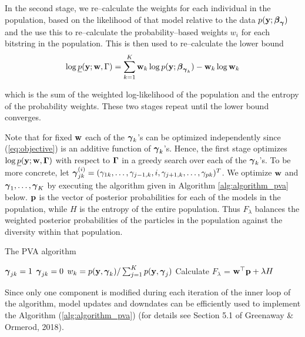 In the second stage, we re--calculate the weights for each individual in the population, based on the
likelihood of that model relative to the data $p({\bf y}; {\boldsymbol \beta}_{\boldsymbol \gamma})$ and the use this to re--calculate the
probability--based weights $w_i$ for each bitstring in the population. This is then used to re--calculate the
lower bound
\[
	\log \underline{p}({\bf y}; {\bf w}, \Gamma) = \sum_{k=1}^K {\bf w}_k \log p({\bf y}; {\boldsymbol \beta}_{{\boldsymbol \gamma}_k}) - {\bf w}_k \log {\bf w}_k
\]

which is the sum of the weighted log-likelihood of the population and the entropy of the probability weights.
These two stages repeat until the lower bound converges.

Note that for fixed ${\bf w}$ each of the ${\boldsymbol \gamma}_k$'s can be optimized independently
since (\ref{eq:objective}) is an additive function of ${\boldsymbol \gamma}_k$'s. Hence,
the first stage optimizes $\log \underline{p}({\bf y};{\bf w},{\boldsymbol \Gamma})$ with respect
to ${\boldsymbol \Gamma}$ in a greedy search over each of the  ${\boldsymbol \gamma}_k$'s. 
To be more concrete, let
${\boldsymbol \gamma}_{jk}^{(i)} = (\gamma_{1k},\ldots,\gamma_{j-1,k},i,\gamma_{j+1,k},\ldots,\gamma_{pk})^T$.
We optimize ${\bf w}$ and ${\boldsymbol \gamma}_1,\ldots,{\boldsymbol \gamma}_K$ by executing the algorithm given in Algorithm
\ref{alg:algorithm_pva} below. ${\bf p}$ is the vector of posterior probabilities for each of the models  in the
population, while $H$ is the entropy of the entire population. Thus $F_\lambda$ balances the weighted
posterior  probabilities of the particles in the population against the diversity within that population.

\begin{algorithm}\label{alg:updateGamma}
	\caption{The PVA algorithm}
	\label{alg:algorithm_pva}
	\begin{algorithmic}
						\STATE ${\boldsymbol \gamma}_{jk} = 1$
					\ELSE
						\STATE ${\boldsymbol \gamma}_{jk} = 0$
					\ENDIF
				\ENDFOR
				\STATE $w_k = p({\bf y}, {\boldsymbol \gamma}_k) / \sum_{j=1}^K p({\bf y}, {\boldsymbol \gamma}_j)$
			\ENDFOR
			\STATE Calculate $F_\lambda$ = ${\bf w}^\top {\bf p} + \lambda H$
		\ENDWHILE
	\end{algorithmic}
\end{algorithm}

	\noindent 
	Since only one component is modified during each iteration of the inner loop of the algorithm, model updates
	and downdates can be efficiently used to implement the Algorithm (\ref{alg:algorithm_pva}) (for details see 
	Section 5.1 of Greenaway \& Ormerod, 2018).

